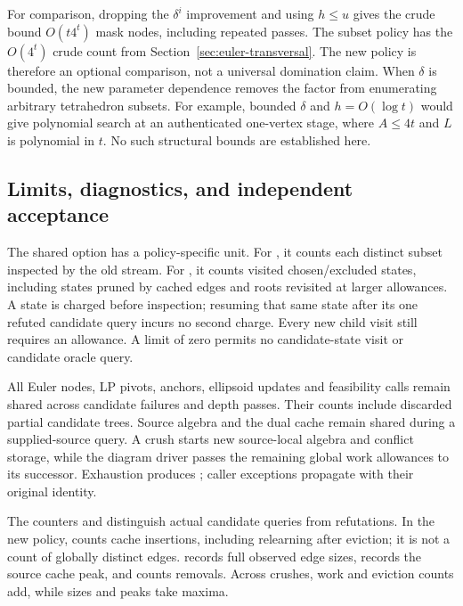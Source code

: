 For comparison, dropping the $\delta^i$ improvement and using $h\le u$
gives the crude bound $O(t4^t)$ mask nodes, including repeated passes.
The subset policy has the $O(4^t)$ crude count from
Section~\ref{sec:euler-transversal}.  The new policy is therefore an
optional comparison, not a universal domination claim.  When $\delta$
is bounded, the new parameter dependence removes the factor from
enumerating arbitrary tetrahedron subsets.  For example, bounded
$\delta$ and $h=O(\log t)$ would give polynomial search at an
authenticated one-vertex stage, where $A\le4t$ and $L$ is polynomial
in $t$.  No such structural bounds are established here.

\subsection{Limits, diagnostics, and independent acceptance}

The shared  option has a policy-specific unit.
For , it counts each distinct subset inspected by the old
stream.  For , it counts visited chosen/excluded states,
including states pruned by cached edges and roots revisited at larger
allowances.  A state is charged before inspection; resuming that same
state after its one refuted candidate query incurs no second charge.
Every new child visit still requires an allowance.  A limit of zero
permits no candidate-state visit or candidate oracle query.

All Euler nodes, LP pivots, anchors, ellipsoid updates and feasibility
calls remain shared across candidate failures and depth passes.  Their
counts include discarded partial candidate trees.  Source algebra and
the dual cache remain shared during a supplied-source query.  A crush
starts new source-local algebra and conflict storage, while the diagram
driver passes the remaining global work allowances to its successor.
Exhaustion produces ; caller exceptions propagate
with their original identity.

The counters  and
 distinguish actual candidate queries from
refutations.  In the new policy,  counts cache
insertions, including relearning after eviction; it is not a count of
globally distinct edges.   records full
observed edge sizes,  records the source
cache peak, and  counts removals.  Across
crushes, work and eviction counts add, while sizes and peaks take maxima.

